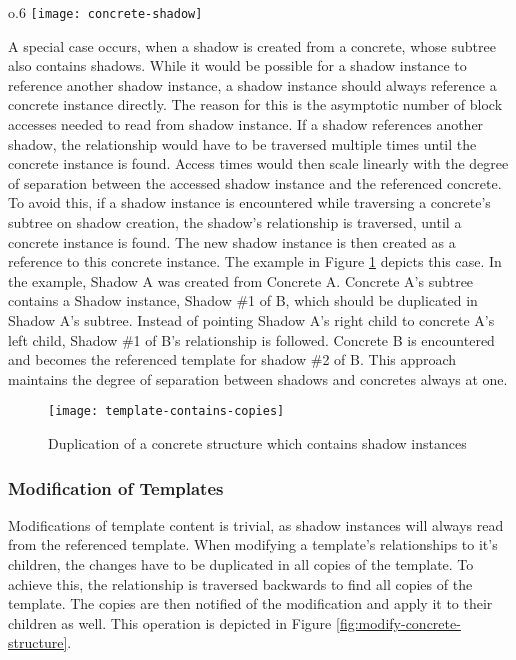         \begin{wrapfigure}{o}{.6\textwidth}
            \centering
            \texttt{[image: concrete-shadow]}
            \caption{Shadow instances duplicate the structure of the concrete items}
            \label{fig:concrete-shadow}
        \end{wrapfigure}

        A special case occurs, when a shadow is created from
        a concrete, whose subtree also contains shadows.
        While it would be possible for a shadow instance to reference another
        shadow instance, a shadow instance should always reference a concrete
        instance directly. The reason for this is the asymptotic number
        of block accesses needed to read from shadow instance. If a shadow references
        another shadow, the  relationship would
        have to be traversed multiple times until the concrete instance
        is found. Access times would then scale linearly with
        the degree of separation between the accessed shadow instance
        and the referenced concrete. To avoid this, if a shadow
        instance is encountered while traversing a concrete's
        subtree on shadow creation, the shadow's 
        relationship is traversed, until a concrete instance is found.
        The new shadow instance is then created as a reference to this
        concrete instance. The example in Figure \ref{fig:template-contains-copies}
        depicts this case. In the example, Shadow A was created from
        Concrete A. Concrete A's subtree contains a Shadow instance,
        Shadow \#1 of B, which should be duplicated in Shadow A's subtree.
        Instead of pointing Shadow A's right child to concrete A's left child,
        Shadow \#1 of B's  relationship is followed.
        Concrete B is encountered
        and becomes the referenced template for shadow \#2 of B.
        This approach maintains the degree of separation between shadows
        and concretes always at one.

        \begin{figure}[H]
            \centering
            \texttt{[image: template-contains-copies]}
            \caption{Duplication of a concrete structure which contains shadow instances}
            \label{fig:template-contains-copies}
        \end{figure}

    \subsubsection{Modification of Templates}
        Modifications of template content is trivial, as shadow instances
        will always read from the referenced template.
        When modifying a template's relationships to it's children,
        the changes have to be duplicated in all copies of the template.
        To achieve this, the  relationship is
        traversed backwards to find all copies of the template. The
        copies are then notified of the modification and apply
        it to their children as well. This operation is
        depicted in Figure \ref{fig:modify-concrete-structure}.

